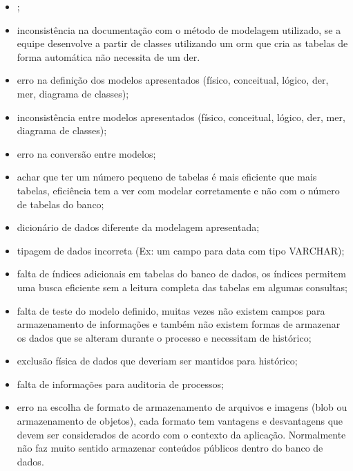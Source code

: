 \begin{itemize}
    \item \erroArmazenarSenhaAberta ;
    
    \item inconsistência na documentação com o método de modelagem utilizado, se a equipe desenvolve a partir de classes utilizando um \ac{orm} que cria as tabelas de forma automática não necessita de um \ac{der}.
    
    \item erro na definição dos modelos apresentados (físico, conceitual, lógico, \ac{der}, \ac{mer}, diagrama de classes);
    
    \item inconsistência entre modelos apresentados (físico, conceitual, lógico, \ac{der}, \ac{mer}, diagrama de classes);

    \item erro na conversão entre modelos;
    
    \item achar que ter um número pequeno de tabelas é mais eficiente que mais tabelas, eficiência tem a ver com modelar corretamente e não com o número de tabelas do banco;
    
    \item dicionário de dados diferente da modelagem apresentada;
    
    \item tipagem de dados incorreta (Ex: um campo para data com tipo VARCHAR);
    
    \item falta de índices adicionais em tabelas do banco de dados, os índices permitem uma busca eficiente sem a leitura completa das tabelas em algumas consultas;
    
    \item falta de teste do modelo definido, muitas vezes não existem campos para armazenamento de informações e também não existem formas de armazenar os dados que se alteram durante o processo e necessitam de histórico;
    
    \item exclusão física de dados que deveriam ser mantidos para histórico;
    
    \item falta de informações para auditoria de processos;
    
    \item erro na escolha de formato de armazenamento de arquivos e imagens (blob ou armazenamento de objetos), cada formato tem vantagens e desvantagens que devem ser considerados de acordo com o contexto da aplicação. Normalmente não faz muito sentido armazenar conteúdos públicos dentro do banco de dados.
    
\end{itemize}

